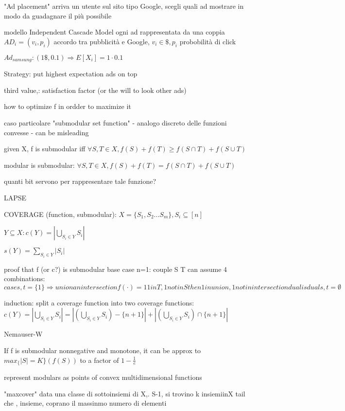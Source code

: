 \documentclass{report}
\begin{document}
	"Ad placement"
	arriva un utente sul sito tipo Google, scegli quali ad mostrare in modo da guadagnare il più possibile
	
	modello Independent Cascade Model
	ogni ad rappresentata da una coppia $AD_i = (v_i, p_i)$ accordo tra pubblicità e Google, $v_i \in \$, p_i$ probobilità di click
	
	$Ad_{samsung} : (1\$, 0.1) \Rightarrow E[X_i] = 1 \cdot 0.1$
	
	Strategy: put highest expectation ads on top
	
	third value,: satisfaction factor (or the will to look other ads)
	
	how to optimize f in ordder to maximize it
	
	caso particolare "submodular set function" - analogo discreto delle funzioni convesse - can be misleading
	
	given X, f is submodular iff $\forall S, T \in X, f(S)+f(T) \geq f(S\cap T) + f(S\cup T)$
	
	modular is submodular: $\forall S, T \in X, f(S)+f(T) = f(S\cap T) + f(S\cup T)$

	quanti bit servono per rappresentare tale funzione?
	
	LAPSE
	
	COVERAGE (function, submodular): $X=\{S_1, S_2...S_m\}, S_i \subseteq [n]$
	
	$Y\subseteq X : c(Y) = |\bigcup_{S_i \in Y}S_i|$
	
	
	$s(Y) = \sum_{S_i \in Y} |S_i|$
	
	
	proof that f (or c?) is submodular
	base case n=1: couple S T can assume 4 combinations: $
	case s, t = \{1\} \Rightarrow union an intersection f(\cdot)= 1	
	1 in T, 1 not in S then 1 in union, 1 not in intersection
	dual is dual
	s, t = \emptyset
	$
	
	induction: split a coverage function into two coverage functions: $c(Y) = |\bigcup_{S_i \in Y}S_i| = |(\bigcup_{S_i \in Y}S_i)-\{n+1\}| + |(\bigcup_{S_i \in Y}S_i) \cap \{n+1\}|$
	
	Nemauser-W
	
	If f is submodular nonnegative and monotone, it can be approx to $max_\{|S|=K\}(f(S))$ to a factor of $1- \frac{1}{e}$
	
	represent modulars as points of convex multidimensional functions
	
	
	"maxcover" data una classe di sottoinsiemi di X,. S-1, si trovino k insiemiinX tail che , insieme, coprano il massinmo numero di elementi
	
\end{document}
